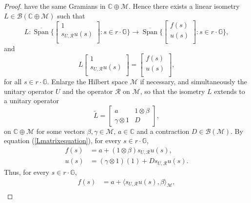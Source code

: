 \documentclass[12pt,reqno]{amsart}
\numberwithin{equation}{section}
\DeclareMathOperator{\spn}{Span}
\theoremstyle{definition}
\begin{document}
\begin{proof}
have the same Gramians in $\mathbb{C}\oplus\mathcal{M}$. Hence there exists a linear isometry $L\in \mathcal{B}(\mathbb{C}\oplus \mathcal{M})$ such that
\begin{equation}\nonumber
L : \overline{\spn}\Bigg\{ \begin{bmatrix}
	1 \\
	s_{U,\mathcal{R}}u(s)\\
\end{bmatrix} : s \in r\cdot \mathbb{G} \Bigg\}\rightarrow 
\overline{\spn}\Bigg\{ \begin{bmatrix}
	f(s) \\
	u(s)\\
\end{bmatrix}: s \in r\cdot \mathbb{G} \Bigg\},
\end{equation}
and
\begin{equation}\label{Lmatrixequation}
L\begin{bmatrix}
	1 \\
	s_{U,\mathcal{R}}u(s)\\
\end{bmatrix} = 
\begin{bmatrix}
	f(s) \\
	u(s)\\
\end{bmatrix},
\end{equation}
for all $s\in r\cdot \mathbb{G}$. Enlarge the Hilbert space $\mathcal{M}$ if necessary, and simultaneously the unitary operator $U$ and the operator $\mathcal{R}$ on $\mathcal{M}$, so that the isometry $L$ extends to a unitary operator
\begin{equation}
	\tilde{L} = \begin{bmatrix}
			a & 1 \otimes \beta \\
			\gamma \otimes 1 & D
			\end{bmatrix},
\end{equation}
on $\mathbb{C}\oplus\mathcal{M}$ for some vectors $\beta, \gamma\in\mathcal{M}$, $a\in \mathbb{C}$ and a contraction $D \in \mathcal{B(M)}$. By equation (\ref{Lmatrixequation}), for every $s\in r\cdot \mathbb{G}$,
\begin{align*}
f(s) &= a+(1\otimes \beta) s_{U,\mathcal{R}}u(s), \\
 u(s)&= (\gamma \otimes 1)(1) + D s_{U,\mathcal{R}}u(s).
\end{align*}
Thus, for every $s\in r\cdot \mathbb{G}$,
\begin{align}
f(s) &= a+\langle s_{U,\mathcal{R}}u(s), \beta \rangle_{\mathcal{M}}, \label{systemofequationsforL}  \\

\end{align}
\end{proof}
\end{document}
